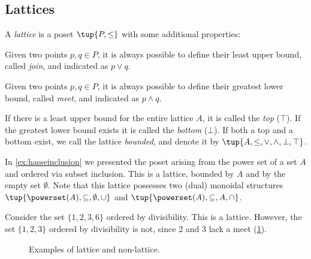 \subsection{Lattices}
\begin{definition}[Lattice]
\label{def:lattice}
A \emph{lattice} is a poset $\tup{P, \leq}$ with some additional properties:
\begin{compactenum}
    \item Given two points $p, q \in P$, it is always possible to define their least upper bound, called \emph{join}, and indicated as $p \vee q$.
    \item Given two points $p, q \in P$, it is always possible to define their greatest lower bound, called \emph{meet}, and indicated as $p \wedge q$.
\end{compactenum}
\end{definition}

\begin{remark}
If there is a least upper bound for the entire lattice $A$, it is called
the \emph{top} ($\top$). If the greatest lower bound exists it is called the \emph{bottom} ($\bot$). If both a top and a bottom exist, we call the lattice \emph{bounded}, and denote it by $\tup{A,\leq,\vee,\wedge,\bot,\top}$.
\end{remark}

\begin{example}
    In \cref{ex:hasseinclusion} we presented the poset arising from the power set of a set $A$ and ordered via subset inclusion. This is a lattice, bounded by $A$ and by the empty set $\emptyset$. Note that this lattice possesses two (dual) monoidal structures $\tup{\powerset(A),\subseteq,\emptyset,\cup}$ and $\tup{\powerset(A),\subseteq,A,\cap}$.
\end{example}

\begin{example}
Consider the set $\{1,2,3,6\}$ ordered by divisibility. This is a lattice. However, the set $\{1,2,3\}$ ordered by divisibility is not, since 2 and 3 lack a meet (\cref{fig:exlattice}).
\begin{figure}[h!]
\begin{center}
\end{center}
\caption{Examples of lattice and non-lattice. \label{fig:exlattice}}
\end{figure}
\end{example}